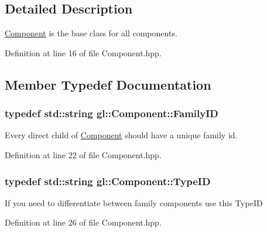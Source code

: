 \subsection{Detailed Description}
\hyperlink{classgl_1_1_component}{Component} is the base class for all components. 

Definition at line 16 of file Component.\-hpp.



\subsection{Member Typedef Documentation}
\hypertarget{classgl_1_1_component_a55fcc946bfc525917e6380e5b71a3f49}{
\subsubsection[{Family\-I\-D}]{\setlength{\rightskip}{0pt plus 5cm}typedef std\-::string {\bf gl\-::\-Component\-::\-Family\-I\-D}}}\label{classgl_1_1_component_a55fcc946bfc525917e6380e5b71a3f49}
Every direct child of \hyperlink{classgl_1_1_component}{Component} should have a unique family id. 

Definition at line 22 of file Component.\-hpp.

\hypertarget{classgl_1_1_component_a2dae94eddffdba218f51d19dd9d66e4e}{
\subsubsection[{Type\-I\-D}]{\setlength{\rightskip}{0pt plus 5cm}typedef std\-::string {\bf gl\-::\-Component\-::\-Type\-I\-D}}}\label{classgl_1_1_component_a2dae94eddffdba218f51d19dd9d66e4e}
If you need to differentiate between family components use this Type\-I\-D 

Definition at line 26 of file Component.\-hpp.




